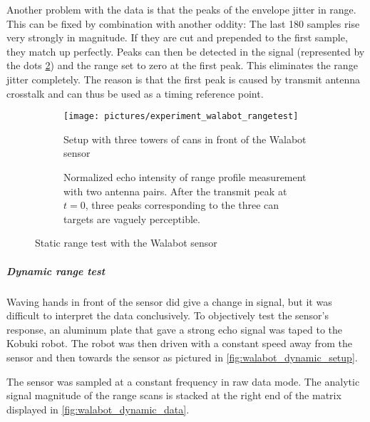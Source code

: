Another problem with the data is that the peaks of the envelope jitter in range. This can be fixed by combination with another oddity: The last 180 samples rise very strongly in magnitude. If they are cut and prepended to the first sample, they match up perfectly. Peaks can then be detected in the signal (represented by the dots \cref{fig:walabot_rangetest_data}) and the range set to zero at the first peak. This eliminates the range jitter completely. The reason is that the first peak is caused by transmit antenna crosstalk and can thus be used as a timing reference point.

\begin{figure}[htbp]
    \centering
    \begin{subfigure}{.8\textwidth}
        \centering
        \texttt{[image: pictures/experiment\_walabot\_rangetest]}
        \caption{Setup with three towers of cans in front of the Walabot sensor}
        \label{fig:walabot_rangetest_setup}
    \end{subfigure}
    \begin{subfigure}{.8\textwidth}
        \centering
        \def\svgwidth{\linewidth}
        
        \caption{Normalized echo intensity of range profile measurement with two antenna pairs. After the transmit peak at \(t=0\), three peaks corresponding to the three can targets are vaguely perceptible. }
        \label{fig:walabot_rangetest_data}
    \end{subfigure}
    \caption{Static range test with the Walabot sensor}
    \label{fig:walabot_rangetest}
\end{figure}

\subparagraph{Dynamic range test}\label{dynamic-range-test}

Waving hands in front of the sensor did give a change in signal, but it
was difficult to interpret the data conclusively. To objectively test
the sensor's response, an aluminum plate that gave a strong echo signal
was taped to the Kobuki robot. The robot was then driven with a constant
speed away from the sensor and then towards the sensor as pictured in
\cref{fig:walabot_dynamic_setup}.

The sensor was sampled at a constant frequency in raw data mode. The
analytic signal magnitude of the range scans is stacked at the right end of the
matrix displayed in \cref{fig:walabot_dynamic_data}.

